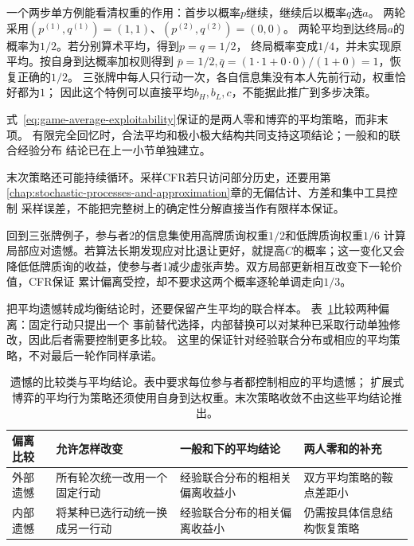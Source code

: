 一个两步单方例能看清权重的作用：首步以概率\(p\)继续，继续后以概率\(q\)选\(a\)。
两轮采用\((p^{(1)},q^{(1)})=(1,1)\)、\((p^{(2)},q^{(2)})=(0,0)\)。
两轮平均到达终局\(a\)的概率为\(1/2\)。若分别算术平均，得到\(p=q=1/2\)，
终局概率变成\(1/4\)，并未实现原平均。按自身到达概率加权则得到
\(\bar p=1/2,\bar q=(1\cdot1+0\cdot0)/(1+0)=1\)，恢复正确的\(1/2\)。
三张牌中每人只行动一次，各自信息集没有本人先前行动，权重恰好都为\(1\)；
因此这个特例可以直接平均\(b_H,b_L,c\)，不能据此推广到多步决策。

式~\eqref{eq:game-average-exploitability}保证的是两人零和博弈的平均策略，而非末项。
有限完全回忆时，合法平均和极小极大结构共同支持这项结论；一般和的联合经验分布
结论已在上一小节单独建立。

末次策略还可能持续循环。采样CFR若只访问部分历史，还要用第
\ref{chap:stochastic-processes-and-approximation}章的无偏估计、方差和集中工具控制
采样误差，不能把完整树上的确定性分解直接当作有限样本保证。

回到三张牌例子，参与者2的信息集使用高牌质询权重\(1/2\)和低牌质询权重\(1/6\)
计算局部应对遗憾。若算法长期发现应对比退让更好，就提高\(C\)的概率；这一变化又会
降低低牌质询的收益，使参与者1减少虚张声势。双方局部更新相互改变下一轮价值，CFR保证
累计偏离受控，却不要求这两个概率逐轮单调走向\(1/3\)。

把平均遗憾转成均衡结论时，还要保留产生平均的联合样本。
表~\ref{tab:game-regret-comparison-conclusions}比较两种偏离：固定行动只提出一个
事前替代选择，内部替换可以对某种已采取行动单独修改，因此后者需要控制更多比较。
这里的保证针对经验联合分布或相应的平均策略，不对最后一轮作同样承诺。

\begin{table}[htbp]
  \centering
  \begin{tabularx}{\linewidth}{lXXX}
    \toprule
    偏离比较 & 允许怎样改变 & 一般和下的平均结论 & 两人零和的补充\\
    \midrule
    外部遗憾 & 所有轮次统一改用一个固定行动 & 经验联合分布的粗相关偏离收益小 & 双方平均策略的鞍点差距小\\
    内部遗憾 & 将某种已选行动统一换成另一行动 & 经验联合分布的相关偏离收益小 & 仍需按具体信息结构恢复策略\\
    \bottomrule
  \end{tabularx}
  \caption{遗憾的比较类与平均结论。表中要求每位参与者都控制相应的平均遗憾；
  扩展式博弈的平均行为策略还须使用自身到达权重。末次策略收敛不由这些平均结论推出。}
  \label{tab:game-regret-comparison-conclusions}
\end{table}

